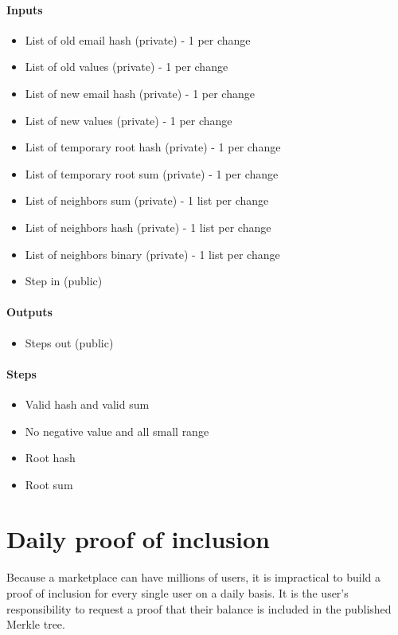 \paragraph{Inputs}
\begin{itemize}
   \item List of old email hash (private) - 1 per change
   \item List of old values (private) - 1 per change
   \item List of new email hash (private) - 1 per change
   \item List of new values (private) - 1 per change
   \item List of temporary root hash (private) - 1 per change
   \item List of temporary root sum (private) - 1 per change
   \item List of neighbors sum (private) - 1 list per change
   \item List of neighbors hash (private) - 1 list per change
   \item List of neighbors binary (private) - 1 list per change
   \item Step in (public)
   \end{itemize}

\paragraph{Outputs}
\begin{itemize}
   \item Steps out (public)
   \end{itemize}

\paragraph{Steps}
\begin{itemize}
   \item Valid hash and valid sum
   \item No negative value and all small range
   \item Root hash
   \item Root sum
   \end{itemize}


\section{Daily proof of inclusion}

Because a marketplace can have millions of users, it is impractical to build a proof of inclusion for every single user on a daily basis.
It is the user's responsibility to request a proof that their balance is included in the published Merkle tree.

